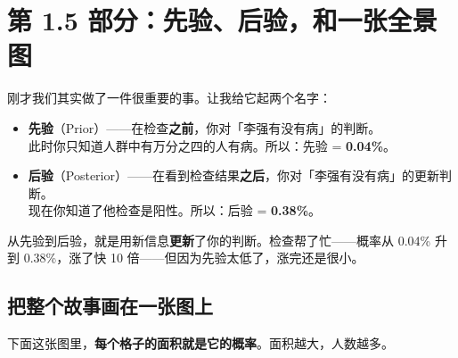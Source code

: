 \documentclass[12pt,a4paper]{article}
\begin{document}
\section*{第 1.5 部分：先验、后验，和一张全景图}

刚才我们其实做了一件很重要的事。让我给它起两个名字：

\begin{ideabox}[两个名字]
\begin{itemize}[leftmargin=2em]
  \item \textbf{先验}（Prior）——在检查\textbf{之前}，你对「李强有没有病」的判断。\\
  此时你只知道人群中有万分之四的人有病。所以：先验 = \textbf{0.04\%}。

  \item \textbf{后验}（Posterior）——在看到检查结果\textbf{之后}，你对「李强有没有病」的更新判断。\\
  现在你知道了他检查是阳性。所以：后验 = \textbf{0.38\%}。
\end{itemize}

从先验到后验，就是用新信息\textbf{更新}了你的判断。检查帮了忙——概率从 0.04\% 升到 0.38\%，涨了快 10 倍——但因为先验太低了，涨完还是很小。
\end{ideabox}

\subsection*{把整个故事画在一张图上}

下面这张图里，\textbf{每个格子的面积就是它的概率}。面积越大，人数越多。
\end{document}

